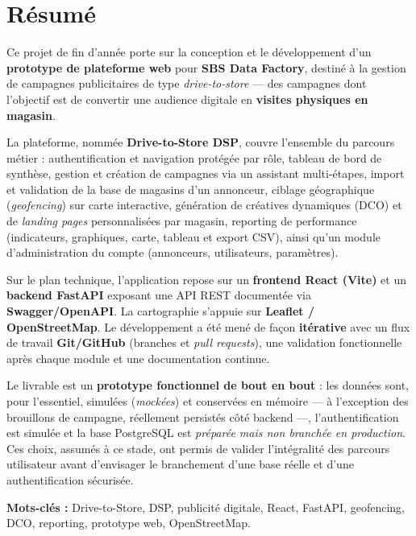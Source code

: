 \chapter*{Résumé}

Ce projet de fin d'année porte sur la conception et le développement d'un
\textbf{prototype de plateforme web} pour \textbf{SBS Data Factory}, destiné à
la gestion de campagnes publicitaires de type \emph{drive-to-store} --- des
campagnes dont l'objectif est de convertir une audience digitale en
\textbf{visites physiques en magasin}.

La plateforme, nommée \textbf{Drive-to-Store DSP}, couvre l'ensemble du
parcours métier : authentification et navigation protégée par rôle, tableau de
bord de synthèse, gestion et création de campagnes via un assistant
multi-étapes, import et validation de la base de magasins d'un annonceur,
ciblage géographique (\emph{geofencing}) sur carte interactive, génération de
créatives dynamiques (DCO) et de \emph{landing pages} personnalisées par
magasin, reporting de performance (indicateurs, graphiques, carte, tableau et
export CSV), ainsi qu'un module d'administration du compte (annonceurs,
utilisateurs, paramètres).

Sur le plan technique, l'application repose sur un \textbf{frontend React
(Vite)} et un \textbf{backend FastAPI} exposant une API REST documentée via
\textbf{Swagger/OpenAPI}. La cartographie s'appuie sur
\textbf{Leaflet / OpenStreetMap}. Le développement a été mené de façon
\textbf{itérative} avec un flux de travail \textbf{Git/GitHub} (branches et
\emph{pull requests}), une validation fonctionnelle après chaque module et une
documentation continue.

Le livrable est un \textbf{prototype fonctionnel de bout en bout} : les
données sont, pour l'essentiel, simulées (\emph{mockées}) et conservées en
mémoire --- à l'exception des brouillons de campagne, réellement persistés
côté backend ---, l'authentification est simulée et la base PostgreSQL est
\emph{préparée mais non branchée en production}. Ces choix, assumés à ce stade, ont permis de valider l'intégralité
des parcours utilisateur avant d'envisager le branchement d'une base réelle et
d'une authentification sécurisée.

\vspace{0.6cm}
\noindent\textbf{Mots-clés :} Drive-to-Store, DSP, publicité digitale,
React, FastAPI, geofencing, DCO, reporting, prototype web, OpenStreetMap.

